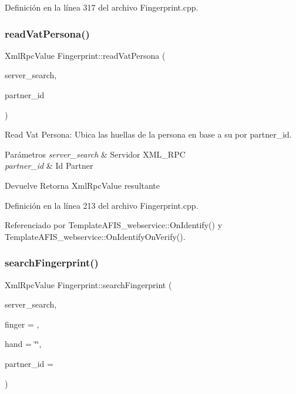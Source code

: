 Definición en la línea 317 del archivo Fingerprint.\+cpp.

\hypertarget{classFingerprint_a83bbd80ab7157b66a568c8a354f86f02}{}\label{classFingerprint_a83bbd80ab7157b66a568c8a354f86f02} 
\subsubsection{\texorpdfstring{read\+Vat\+Persona()}{readVatPersona()}}
{\footnotesize\ttfamily Xml\+Rpc\+Value Fingerprint\+::read\+Vat\+Persona (\begin{DoxyParamCaption}\item[{Xml\+Rpc\+Client}]{server\+\_\+search,  }\item[{Xml\+Rpc\+Value}]{partner\+\_\+id }\end{DoxyParamCaption})\hspace{0.3cm}{\ttfamily [inline]}}



Read Vat Persona\+: Ubica las huellas de la persona en base a su por partner\+\_\+id. 


\begin{DoxyParams}{Parámetros}
{\em server\+\_\+search} & Servidor X\+M\+L\+\_\+\+R\+PC \\
\hline
{\em partner\+\_\+id} & Id Partner \\
\hline
\end{DoxyParams}
\begin{DoxyReturn}{Devuelve}
Retorna Xml\+Rpc\+Value resultante 
\end{DoxyReturn}


Definición en la línea 213 del archivo Fingerprint.\+cpp.



Referenciado por Template\+A\+F\+I\+S\+\_\+webservice\+::\+On\+Identify() y Template\+A\+F\+I\+S\+\_\+webservice\+::\+On\+Identify\+On\+Verify().

\hypertarget{classFingerprint_a35437b95c59d90bb3719f3d90f5f300b}{}\label{classFingerprint_a35437b95c59d90bb3719f3d90f5f300b} 
\subsubsection{\texorpdfstring{search\+Fingerprint()}{searchFingerprint()}}
{\footnotesize\ttfamily Xml\+Rpc\+Value Fingerprint\+::search\+Fingerprint (\begin{DoxyParamCaption}\item[{Xml\+Rpc\+Client}]{server\+\_\+search,  }\item[{int}]{finger = {},  }\item[{string}]{hand = {\ttfamily \char`\"{}\char`\"{}},  }\item[{long int}]{partner\+\_\+id = {} }\end{DoxyParamCaption})\hspace{0.3cm}{\ttfamily [inline]}}



